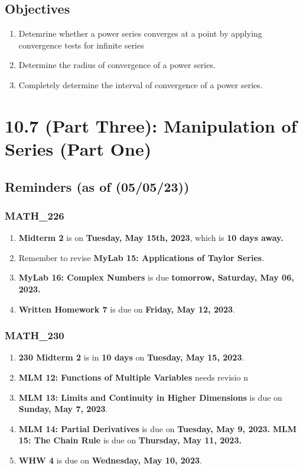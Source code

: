 \section{Objectives}
\begin{enumerate}
  \item Detemrine whether a power series converges at a point
        by applying convergence tests for infinite series
  \item Determine the radius of convergence of a power
        series.
  \item Completely determine the interval of
        convergence of a power series.
\end{enumerate}

\chapter{10.7 (Part Three): Manipulation of Series (Part One)}
\section{Reminders (as of (05/05/23))}
\subsection{MATH\_226}
\begin{enumerate}
  \item  \textbf{Midterm 2} is on \textbf{Tuesday, May 15th, 2023}, which is \textbf{10 days away.}
  \item Remember to revise \textbf{MyLab 15:
        Applications of Taylor Series}.
  \item \textbf{MyLab 16: Complex Numbers} is
        due \textbf{tomorrow, Saturday, May 06, 2023.}
  \item \textbf{Written Homework 7} is due on
        \textbf{Friday, May 12, 2023}.
\end{enumerate}
\subsection{MATH\_230}
\begin{enumerate}
  \item \textbf{230 Midterm 2} is in \textbf{10 days} on
        \textbf{Tuesday, May 15, 2023}.
  \item \textbf{MLM 12: Functions of Multiple Variables} needs revisio n
  \item \textbf{MLM 13: Limits and Continuity in Higher
        Dimensions} is due on \textbf{Sunday, May 7, 2023}.
  \item \textbf{MLM 14: Partial Derivatives} is due on
        \textbf{Tuesday, May 9, 2023.}
        \textbf \textbf{MLM 15: The Chain Rule} is due on
        \textbf{Thursday, May 11, 2023.}
  \item \textbf{WHW 4} is due on \textbf{Wednesday,
        May 10, 2023}.

\end{enumerate}


